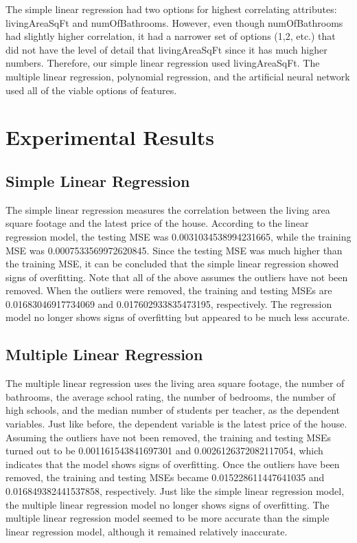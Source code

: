 \documentclass[a4paper]{article}
\begin{document}
	The simple linear regression had two options for highest correlating attributes: livingAreaSqFt and numOfBathrooms. However, even though numOfBathrooms had slightly higher correlation, it had a narrower set of options (1,2, etc.) that did not have the level of detail that livingAreaSqFt since it has much higher numbers. Therefore, our simple linear regression used livingAreaSqFt. The multiple linear regression, polynomial regression, and the artificial neural network used all of the viable options of features.
	
	\section{Experimental Results}
	
	\subsection{Simple Linear Regression}
	
	The simple linear regression measures the correlation between the living area square footage and the latest price of the house. According to the linear regression model, the testing MSE was 0.0031034538994231665, while the training MSE was 0.0007533569972620845. Since the testing MSE was much higher than the training MSE, it can be concluded that the simple linear regression showed signs of overfitting. Note that all of the above assumes the outliers have not been removed. When the outliers were removed, the training and testing MSEs are 0.01683046917734069 and 0.017602933835473195, respectively. The regression model no longer shows signs of overfitting but appeared to be much less accurate.
	
	
	\subsection{Multiple Linear Regression}
	
	The multiple linear regression uses the living area square footage, the number of bathrooms, the average school rating, the number of bedrooms, the number of high schools, and the median number of students per teacher, as the dependent variables. Just like before, the dependent variable is the latest price of the house. Assuming the outliers have not been removed, the training and testing MSEs turned out to be 0.001161543841697301 and 0.0026126372082117054, which indicates that the model shows signs of overfitting. Once the outliers have been removed, the training and testing MSEs became 0.015228611447641035 and 0.016849382441537858, respectively. Just like the simple linear regression model, the multiple linear regression model no longer shows signs of overfitting. The multiple linear regression model seemed to be more accurate than the simple linear regression model, although it remained relatively inaccurate.
	
\end{document}
